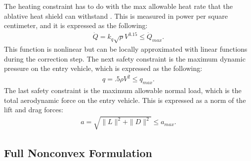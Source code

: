  The heating constraint has to do with the max allowable heat rate that the ablative heat shield can withstand \cite{edquist2007}. This is measured in power per square centimeter, and it is expressed as the following:
 \begin{align}
     \dot{Q} = k_q \sqrt{\rho}V^{3.15} \leq \dot{Q}_{max}. \label{eq:con_heat}
 \end{align} 
 This function is nonlinear but can be locally approximated with linear functions during the correction step.  The next safety constraint is the maximum dynamic pressure on the entry vehicle, which is expressed as the following:
 \begin{align}
     q = .5 \rho V^2 \leq q_{max}.\label{eq:con_press}
 \end{align}
 The last safety constraint is the maximum allowable normal load, which is the total aerodynamic force on the entry vehicle. This is expressed as a norm of the lift and drag forces:
 \begin{align}
     a = \sqrt{\|L\|^2 + \|D\|^2} \leq a_{max}.\label{eq:con_load}
 \end{align}
\subsection{Full Nonconvex Formulation}

